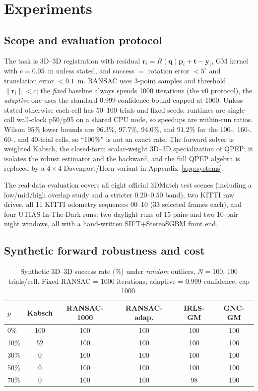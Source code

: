 \section{Experiments}
\label{sec:experiments}

\subsection{Scope and evaluation protocol}

The task is 3D--3D registration with residual
$\mathbf{r}_i=R(\mathbf{q})\mathbf{p}_i+\mathbf{t}-\mathbf{y}_i$, GM kernel with $c=0.05$~m unless
stated, and success $=$ rotation error $<5^\circ$ and translation error $<0.1$~m. RANSAC uses
3-point samples and threshold $\|\mathbf{r}_i\|<c$; the \emph{fixed} baseline always spends 1000
iterations (the v0 protocol), the \emph{adaptive} one uses the standard 0.999 confidence bound capped
at 1000. Unless stated otherwise each cell has 50--100 trials and fixed seeds; runtimes are
single-call wall-clock p50/p95 on a shared CPU node, so speedups are within-run ratios. Wilson $95\%$
lower bounds are $96.3\%$, $97.7\%$, $94.0\%$, and $91.2\%$ for the 100-, 160-, 60-, and 40-trial
cells, so ``100\%'' is not an exact rate. The forward solver is weighted Kabsch, the closed-form
scalar-weight 3D--3D specialization of QPEP; it isolates the robust estimator and the backward, and
the full QPEP algebra is replaced by a $4\times4$ Davenport/Horn variant in
Appendix~\ref{app:systems}.

The real-data evaluation covers all eight official 3DMatch test scenes (including a low/mid/high
overlap study and a stricter $0.20$--$0.50$ band), two KITTI raw drives, all 11 KITTI odometry
sequences 00--10 (33 selected frames each), and four UTIAS In-The-Dark runs: two daylight runs of 15
pairs and two 10-pair night windows, all with a hand-written SIFT+StereoSGBM front end.

\subsection{Synthetic forward robustness and cost}

\begin{table}[t]
\caption{Synthetic 3D--3D success rate (\%) under \emph{random} outliers, $N=100$,
100 trials/cell. Fixed RANSAC = 1000 iterations; adaptive = 0.999 confidence, cap 1000.}
\label{tab:synthetic}
\centering
\footnotesize
\setlength{\tabcolsep}{2.0pt}
\begin{tabular}{lccccc}
\toprule
$p$ & Kabsch & RANSAC-1000 & RANSAC-adap. & IRLS-GM & GNC-GM \\
\midrule
0\%  & 100 & 100 & 100 & 100 & 100 \\
10\% & 52  & 100 & 100 & 100 & 100 \\
30\% & 0   & 100 & 100 & 100 & 100 \\
50\% & 0   & 100 & 100 & 100 & 100 \\
70\% & 0   & 100 & 100 & 98  & 100 \\
\bottomrule
\end{tabular}
\end{table}

